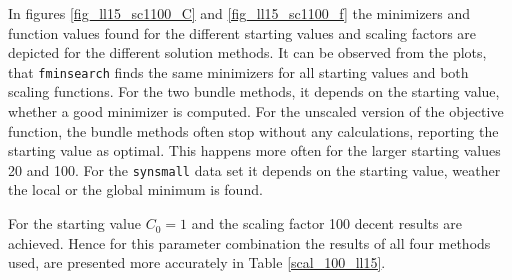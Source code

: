 In figures \ref{fig_ll15_sc1100_C} and \ref{fig_ll15_sc1100_f} the minimizers and function values found for the different starting values and scaling factors are depicted for the different solution methods.
It can be observed from the plots, that \texttt{fminsearch} finds the same minimizers for all starting values and both scaling functions.
For the two bundle methods, it depends on the starting value, whether a good minimizer is computed. For the unscaled version of the objective function, the bundle methods often stop without any calculations, reporting the starting value as optimal. This happens more often for the larger starting values 20 and 100.
For the \texttt{synsmall} data set it depends on the starting value, weather the local or the global minimum is found.

For the starting value \(C_0 =1\) and the scaling factor 100 decent results are achieved.
Hence for this parameter combination the results of all four methods used, are presented more accurately in Table \ref{scal_100_ll15}.

